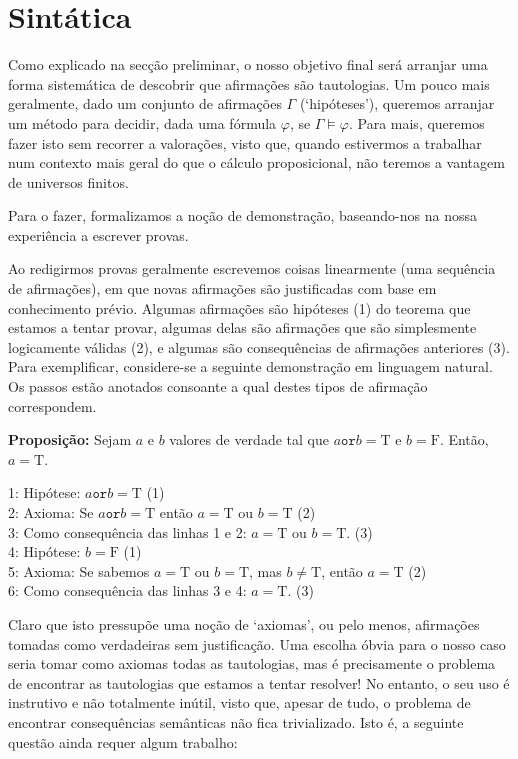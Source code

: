 \documentclass{report}
\theoremstyle{definition}
\theoremstyle{remark}
\newcommand{\lt}{\mathrm{T}}
\newcommand{\lf}{\mathrm{F}}
\newcommand{\por}{\mathbin{\texttt{or}}}
\begin{document}
	\section{Sintática}
	
	Como explicado na secção preliminar, o nosso objetivo final será arranjar uma forma sistemática de descobrir que afirmações são tautologias. Um pouco mais geralmente, dado um conjunto de afirmações $\Gamma$ (`hipóteses'), queremos arranjar um método para decidir, dada uma fórmula $\varphi$, se $\Gamma \vDash \varphi$. Para mais, queremos fazer isto sem recorrer a valorações, visto que, quando estivermos a trabalhar num contexto mais geral do que o cálculo proposicional, não teremos a vantagem de universos finitos.
	
	Para o fazer, formalizamos a noção de demonstração, baseando-nos na nossa experiência a escrever provas.
	
	Ao redigirmos provas geralmente escrevemos coisas linearmente (uma sequência de afirmações), em que novas afirmações são justificadas com base em conhecimento prévio. Algumas afirmações são hipóteses (1) do teorema que estamos a tentar provar, algumas delas são afirmações que são simplesmente logicamente válidas (2), e algumas são consequências de afirmações anteriores (3). Para exemplificar, considere-se a seguinte demonstração em linguagem natural. Os passos estão anotados consoante a qual destes tipos de afirmação correspondem.
	
	\medskip
	
	\textbf{Proposição:} Sejam $a$ e $b$ valores de verdade tal que $a \por b = \lt$ e $b = \lf$. Então, $a = \lt$.
	
	\begin{adjustwidth}{1cm}{}
	1: Hipótese: $a \por b = \lt$ (1)\\
	2: Axioma: Se $a \por b = \lt$ então $a = \lt$ ou $b = \lt$ (2)\\
	3: Como consequência das linhas 1 e 2: $a = \lt$ ou $b = \lt$. (3)\\
	4: Hipótese: $b = \lf$ (1)\\
	5: Axioma: Se sabemos $a = \lt$ ou $b = \lt$, mas $b \neq \lt$, então $a = \lt$ (2)\\
	6: Como consequência das linhas 3 e 4: $a = \lt$. (3)
	\end{adjustwidth}
	
	\medskip
	
	Claro que isto pressupõe uma noção de `axiomas', ou pelo menos, afirmações tomadas como verdadeiras sem justificação. Uma escolha óbvia para o nosso caso seria tomar como axiomas todas as tautologias, mas é precisamente o problema de encontrar as tautologias que estamos a tentar resolver! No entanto, o seu uso é instrutivo e não totalmente inútil, visto que, apesar de tudo, o problema de encontrar consequências semânticas não fica trivializado. Isto é, a seguinte questão ainda requer algum trabalho:
	
\end{document}
